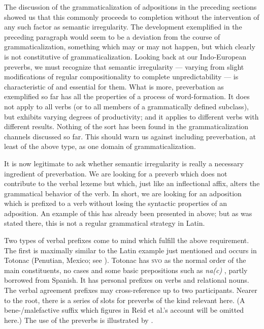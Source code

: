 The discussion of the grammaticalization of adpositions in the preceding sections showed us that this commonly proceeds to completion without the intervention of any such factor as semantic irregularity. The development exemplified in the preceding paragraph would seem to be a deviation from the course of grammaticalization, something which may or may not happen, but which clearly is not constitutive of grammaticalization. Looking back at our Indo-European preverbs, we must recognize that semantic irregularity — varying from slight modifications of regular compositionality to complete unpredictability — is characteristic of and essential for them. What is more, preverbation as exemplified so far has all the properties of a process of word-formation. It does not apply to all verbs (or to all members of a grammatically defined subclass), but exhibits varying degrees of productivity; and it applies to different verbs with different results. Nothing of the sort has been found in the grammaticalization channels discussed so far. This should warn us against including preverbation, at least of the above type, as one domain of grammaticalization.

It is now legitimate to ask whether semantic irregularity is really a necessary ingredient of preverbation. We are looking for a preverb which does not contribute to the verbal lexeme but which, just like an inflectional affix, alters the grammatical behavior of the verb. In short, we are looking for an adposition which is prefixed to a verb without losing the syntactic properties of an adposition. An example of this has already been presented in  above; but as was stated there, this is not a regular grammatical strategy in Latin.

Two types of verbal prefixes come to mind which fulfill the above requirement. The first is maximally similar to the Latin example just mentioned and occurs in Totonac (Penutian, Mexico; see \citealt[24--30]{Reid1968}). Totonac has \textsc{svo} as the normal order of the main constituents, no cases and some basic prepositions such as \textit{na(c)} \glloc, partly borrowed from Spanish. It has personal prefixes on verbs and relational nouns. The verbal agreement prefixes may cross-reference up to two participants. Nearer to the root, there is a series of slots for preverbs of the kind relevant here. (A bene-/malefactive suffix which figures in Reid et al.'s account will be omitted here.) The use of the preverbs is illustrated by .

